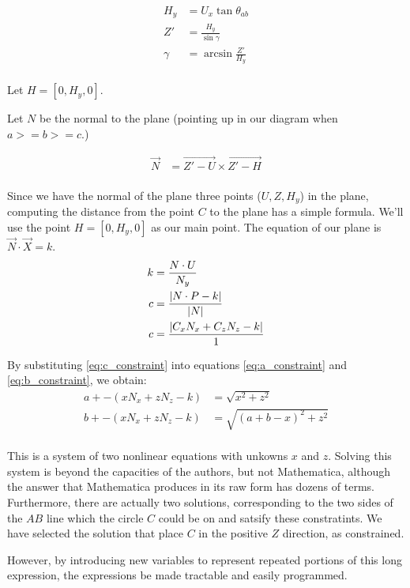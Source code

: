 \documentclass{article}
\begin{document}
\begin{align}
  H_y &= U_x \tan{\theta_{ab}} \\
  Z' &= \frac{H_y}{\sin{\gamma}} \\
  \gamma &= \arcsin{\frac{Z'}{H_y}} \label{eq:gamma} \\
\end{align}

Let $H = [0, H_y,0]$.

Let $N$ be the normal to the plane (pointing up in our diagram
when $ a >= b >= c $.)

\begin{align}
\overrightarrow{N} &= \overrightarrow{Z' - U}  \times \overrightarrow{Z' - H} \\
\end{align}

Since we have the normal of the plane three points ($U,Z,H_y$) in the plane,
computing the distance from the point $C$ to the plane has a simple
formula. We'll use the point $H = [0, H_y, 0]$ as our main point.
The equation of our plane is
$ \overrightarrow{N} \cdot \overrightarrow{X} = k$.
\begin{align}
k &= \frac{N \cdot U}{N_y} \\
c &= \frac{\left\lvert N \cdot P - k\right\rvert}{\left\lvert N\right\rvert} \\
c &= \frac{\left\lvert C_x  N_x  + C_z  N_z - k\right\rvert}{1} \label{eq:c_constraint}\\
\end{align}

By substituting \ref{eq:c_constraint} into equations
\ref{eq:a_constraint} and \ref{eq:b_constraint},
we obtain:
\begin{align}
a +  -(x N_x + z N_z - k) &= \sqrt{x^2 + z ^2} \\
b +  -(x N_x + z N_z - k) &= \sqrt{(a+b-x)^2 + z^2} \\
\end{align}

This is a system of two nonlinear equations with unkowns $x$ and $z$.
Solving this system is beyond the capacities of the authors,
but not Mathematica, although the answer that Mathematica produces
in its raw form has dozens of terms.
Furthermore, there are actually two solutions, corresponding
to the two sides of the $AB$ line which the circle $C$ could be
on and satsify these constratints.
We have selected the solution that place $C$ in the positive $Z$
direction, as constrained.

However, by introducing new variables to represent repeated
portions of this long expression, the expressions be
made tractable and easily programmed.
\end{document}

